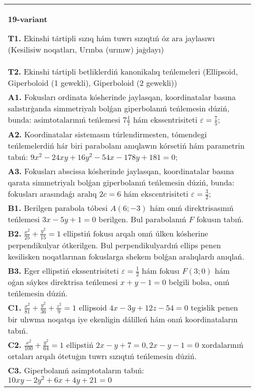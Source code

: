 \documentclass{article}
\begin{document}
\begin{tabular}{m{17cm}}
\textbf{19-variant}
\newline

\textbf{T1.} Ekinshi tártipli sızıq hám tuwrı sızıqtıń óz ara jaylasıwı (Kesilisiw noqatları, Urınba (urınıw) jaģdayı) \\
\textbf{T2.} Ekinshi tártipli betliklerdiń kanonikalıq teńlemeleri (Ellipsoid, Giperboloid (1 gewekli), Giperboloid (2 gewekli)) \\
\textbf{A1.} Fokusları ordinata kósherinde jaylasqan, koordinatalar basına salıstırģanda simmetriyalı bolǵan giperbolanıń teńlemesin dúziń, bunda: asimtotalarınıń teńlemesi $7 \frac{1}{7}$ hám ekssentrisiteti $\varepsilon=\frac{7}{5}$; \\
\textbf{A2.} Koordinatalar sistemasın túrlendirmesten, tómendegi teńlemelerdiń hár biri parabolanı anıqlawın kórsetiń hám parametrin tabıń: $9 x^2-24 x y+16 y^2-54 x-178 y+181=0$; \\
\textbf{A3.} Fokusları abscissa kósherinde jaylasqan, koordinatalar basına qarata simmetriyalı bolǵan giperbolanıń teńlemesin dúziń, bunda: fokusları arasındaǵı aralıq $2 c=6$ hám ekscentrisiteti $\varepsilon=\frac{3}{2}$; \\
\textbf{B1.} Berilgen parabola tóbesi $A (6;-3) $ hám onıń direktrisasınıń teńlemesi $3x-5y+1=0$ berilgen. Bul parabolanıń $F$ fokusın tabıń. \\
\textbf{B2.} $\frac{x^2}{25}+\frac{y^2}{15}=1$ ellipstiń fokusı arqalı onıń úlken kósherine perpendikulyar ótkerilgen. Bul perpendikulyardıń ellips penen kesilisken noqatlarınan fokuslarga shekem bolǵan aralıqlardı anıqlań. \\
\textbf{B3.} Eger ellipstiń ekssentrisiteti $\varepsilon=\frac{1}{2}$ hám fokusı $F (3; 0) $ hám oǵan sáykes direktrisa teńlemesi $x+y-1=0$ belgili bolsa, onıń teńlemesin dúziń. \\
\textbf{C1.} $\frac{x^2}{81}+\frac{y^2}{36}+\frac{z^2}{9}=1$ ellipsoid $4 x-3 y+12 z-54=0$ tegislik penen bir ulıwma noqatqa iye ekenligin dálilleń hám onıń koordinataların tabıń. \\
\textbf{C2.} $\frac{x^2}{100}+\frac{y^2}{64}=1$ ellipstiń $2 x-y+7=0,2 x-y-1=0$ xordalarınıń ortaları arqalı ótetuģın tuwrı sızıqtıń teńlemesin dúziń. \\
\textbf{C3.} Giperbolanıń asimptotaların tabıń: $10 x y-2 y^2+6 x+4 y+21=0$ \\

\end{tabular}
\vspace{1cm}
\end{document}
